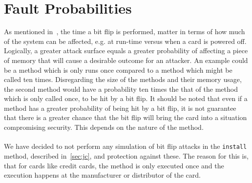 \section{Fault Probabilities}
As mentioned in~, the time a bit flip is performed, matter in terms of how much of the system can be affected, e.g. at run-time versus when a card is powered off. Logically, a greater attack surface equals a greater probability of affecting a piece of memory that will cause a desirable outcome for an attacker. An example could be a method which is only runs once compared to a method which might be called ten times. Disregarding the size of the methods and their memory usage, the second method would have a probability ten times the that of the method which is only called once, to be hit by a bit flip. It should be noted that even if a method has a greater probability of being hit by a bit flip, it is not guarantee that there is a greater chance that the bit flip will bring the card into a situation compromising security. This depends on the nature of the method.\\\\
We have decided to not perform any simulation of bit flip attacks in the \texttt{install} method, described in~\cref{sec:jc}, and protection against these. The reason for this is, that for cards like credit cards, the method is only executed once and the execution happens at the manufacturer or distributor of the card.

%
